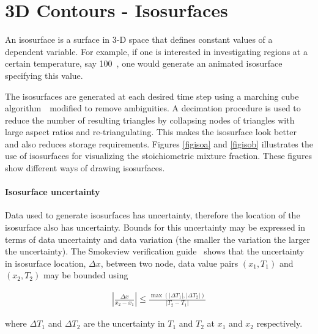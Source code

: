 \documentclass[11pt,twoside]{book}
\begin{document}
%
%

\clearpage
\section{3D Contours - Isosurfaces}
An isosurface is a surface in 3-D space that defines constant
values of a dependent variable. For example, if one is interested
in investigating regions at a certain temperature, say
100~\degC, one would generate an animated isosurface
specifying this value.

The isosurfaces are generated at each desired time step using a
marching cube algorithm~\cite{marchingcubes}\ modified to remove
ambiguities. A decimation procedure is used to reduce the number
of resulting triangles by collapsing nodes of triangles with large
aspect ratios and re-triangulating. This makes the isosurface look
better and also reduces storage requirements. Figures
\ref{figisoa} and \ref{figisob} illustrates the use of isosurfaces
for visualizing the stoichiometric mixture fraction. These figures
show different ways of drawing isosurfaces.

\paragraph{Isosurface uncertainty} Data used to generate isosurfaces
has uncertainty, therefore the location of the isosurface
also has uncertainty.  Bounds for this uncertainty may be expressed
in terms of data uncertainty and data variation (the smaller the
variation the larger the uncertainty).
The Smokeview verification guide~\cite{Smokeview_Verification_Guide}
shows that the uncertainty in isosurface location, $\Delta x$,
between two node, data value pairs $(x_1,T_1)$ and $(x_2,T_2)$  may be bounded using

\begin{eqnarray}
\left|\frac{\Delta x}{x_2-x_1}\right|\le \frac{\max(|\Delta
T_1|,|\Delta T_2|)}{|T_2-T_1|}
\end{eqnarray}

\noindent where $\Delta T_1$ and $\Delta T_2$ are the uncertainty
in $T_1$ and $T_2$ at $x_1$ and $x_2$ respectively.
\end{document}
